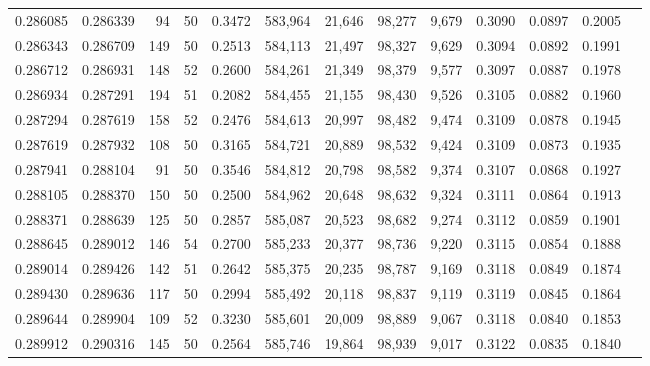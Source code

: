 \begin{tabular}{rrrrrrrrrrrrr}
0.286085 & 0.286339 &    94 &  50 &                                     0.3472 & 583,964 &  21,646 &  98,277 &   9,679 & 0.3090 & 0.0897 & 0.2005 \\
0.286343 & 0.286709 &   149 &  50 &                                     0.2513 & 584,113 &  21,497 &  98,327 &   9,629 & 0.3094 & 0.0892 & 0.1991 \\
0.286712 & 0.286931 &   148 &  52 &                                     0.2600 & 584,261 &  21,349 &  98,379 &   9,577 & 0.3097 & 0.0887 & 0.1978 \\
0.286934 & 0.287291 &   194 &  51 &                                     0.2082 & 584,455 &  21,155 &  98,430 &   9,526 & 0.3105 & 0.0882 & 0.1960 \\
0.287294 & 0.287619 &   158 &  52 &                                     0.2476 & 584,613 &  20,997 &  98,482 &   9,474 & 0.3109 & 0.0878 & 0.1945 \\
0.287619 & 0.287932 &   108 &  50 &                                     0.3165 & 584,721 &  20,889 &  98,532 &   9,424 & 0.3109 & 0.0873 & 0.1935 \\
0.287941 & 0.288104 &    91 &  50 &                                     0.3546 & 584,812 &  20,798 &  98,582 &   9,374 & 0.3107 & 0.0868 & 0.1927 \\
0.288105 & 0.288370 &   150 &  50 &                                     0.2500 & 584,962 &  20,648 &  98,632 &   9,324 & 0.3111 & 0.0864 & 0.1913 \\
0.288371 & 0.288639 &   125 &  50 &                                     0.2857 & 585,087 &  20,523 &  98,682 &   9,274 & 0.3112 & 0.0859 & 0.1901 \\
0.288645 & 0.289012 &   146 &  54 &                                     0.2700 & 585,233 &  20,377 &  98,736 &   9,220 & 0.3115 & 0.0854 & 0.1888 \\
0.289014 & 0.289426 &   142 &  51 &                                     0.2642 & 585,375 &  20,235 &  98,787 &   9,169 & 0.3118 & 0.0849 & 0.1874 \\
0.289430 & 0.289636 &   117 &  50 &                                     0.2994 & 585,492 &  20,118 &  98,837 &   9,119 & 0.3119 & 0.0845 & 0.1864 \\
0.289644 & 0.289904 &   109 &  52 &                                     0.3230 & 585,601 &  20,009 &  98,889 &   9,067 & 0.3118 & 0.0840 & 0.1853 \\
0.289912 & 0.290316 &   145 &  50 &                                     0.2564 & 585,746 &  19,864 &  98,939 &   9,017 & 0.3122 & 0.0835 & 0.1840 \\

\end{tabular}

